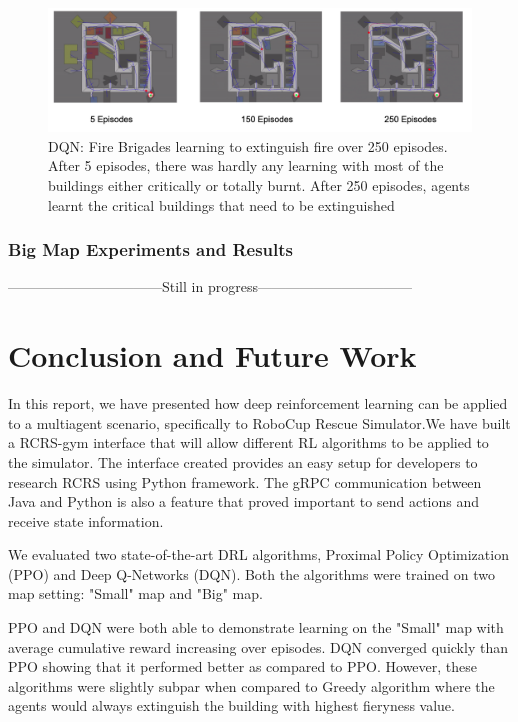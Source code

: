 \documentclass[12pt]{report}
\begin{document}
\begin{figure}[!h]
    \centering
    \includegraphics[width=17cm]{DQN.png}
    \caption{DQN: Fire Brigades learning to extinguish fire over 250 episodes. After 5 episodes, there was hardly any learning with most of the buildings either critically or totally burnt. After 250 episodes, agents learnt the critical buildings that need to be extinguished}
    \label{fig:DQNLearningSmallMap}
\end{figure}

\subsection{Big Map Experiments and Results}
---------------------------------Still in progress---------------------------------


\chapter{Conclusion and Future Work}

In this report, we have presented how deep reinforcement learning can be applied to a multiagent scenario, specifically to RoboCup Rescue Simulator.We have built a RCRS-gym interface that will allow different RL algorithms to be applied to the simulator. The interface created provides an easy setup for developers to research RCRS using Python framework. The gRPC communication between Java and Python is also a feature that proved important to send actions and receive state information. 

We evaluated two state-of-the-art DRL algorithms, Proximal Policy Optimization (PPO) and Deep Q-Networks (DQN). Both the algorithms were trained on two map setting: "Small" map and "Big" map. 

PPO and DQN were both able to demonstrate learning on the "Small" map with average cumulative reward increasing over episodes. DQN converged quickly than PPO showing that it performed better as compared to PPO. However, these algorithms were slightly subpar when compared to Greedy algorithm where the agents would always extinguish the building with highest fieryness value. 
\end{document}
